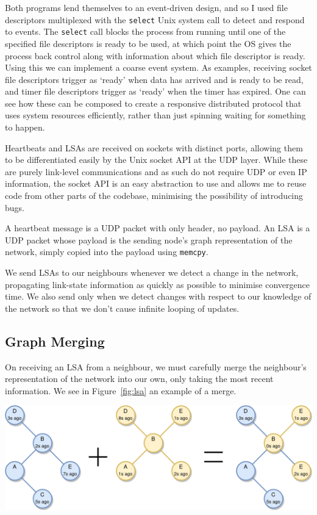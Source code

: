 \documentclass[withindex,glossary,openany]{cam-thesis}
\begin{document}
Both programs lend themselves to an event-driven design, and so I used file descriptors multiplexed with the \texttt{select} Unix system call to detect and respond to events. The \texttt{select} call blocks the process from running until one of the specified file descriptors is ready to be used, at which point the OS gives the process back control along with information about which file descriptor is ready. Using this we can implement a coarse event system. As examples, receiving socket file descriptors trigger as `ready' when data has arrived and is ready to be read, and timer file descriptors trigger as `ready' when the timer has expired. One can see how these can be composed to create a responsive distributed protocol that uses system resources efficiently, rather than just spinning waiting for something to happen.

Heartbeats and LSAs are received on sockets with distinct ports, allowing them to be differentiated easily by the Unix socket API at the UDP layer. While these are purely link-level communications and as such do not require UDP or even IP information, the socket API is an easy abstraction to use and allows me to reuse code from other parts of the codebase, minimising the possibility of introducing bugs.

A heartbeat message is a UDP packet with only header, no payload. An LSA is a UDP packet whose payload is the sending node's graph representation of the network, simply copied into the payload using \texttt{memcpy}.

We send LSAs to our neighbours whenever we detect a change in the network, propagating link-state information as quickly as possible to minimise convergence time. We also send only when we detect changes with respect to our knowledge of the network so that we don't cause infinite looping of updates.

\subsection{Graph Merging}

On receiving an LSA from a neighbour, we must carefully merge the neighbour's representation of the network into our own, only taking the most recent information. We see in Figure~\ref{fig:lsa} an example of a merge.

\begin{center}
\begin{minipage}{0.9\textwidth} \centering
	\includegraphics[width=1\textwidth]{lsa}
	\label{fig:lsa}
\end{minipage}
\end{center}
\end{document}
